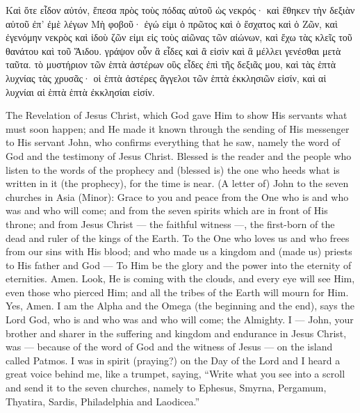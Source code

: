 \begin{pages}
\begin{Rightside}
		\pend
		\pstart
			Καὶ ὅτε εἶδον αὐτόν, ἔπεσα πρὸς τοὺς πόδας αὐτοῦ ὡς νεκρός· καὶ ἔθηκεν τὴν δεξιὰν αὐτοῦ ἐπ’ ἐμὲ λέγων Μὴ φοβοῦ· ἐγώ εἰμι ὁ πρῶτος καὶ ὁ ἔσχατος καὶ ὁ Ζῶν, καὶ ἐγενόμην νεκρὸς καὶ ἰδοὺ ζῶν εἰμι εἰς τοὺς αἰῶνας τῶν αἰώνων, καὶ ἔχω τὰς κλεῖς τοῦ θανάτου καὶ τοῦ Ἅιδου. γράψον οὖν ἃ εἶδες καὶ ἃ εἰσὶν καὶ ἃ μέλλει γενέσθαι μετὰ ταῦτα. τὸ μυστήριον τῶν ἑπτὰ ἀστέρων οὓς εἶδες ἐπὶ τῆς δεξιᾶς μου, καὶ τὰς ἑπτὰ λυχνίας τὰς χρυσᾶς· οἱ ἑπτὰ ἀστέρες ἄγγελοι τῶν ἑπτὰ ἐκκλησιῶν εἰσίν, καὶ αἱ λυχνίαι αἱ ἑπτὰ ἑπτὰ ἐκκλησίαι εἰσίν.
		\pend
        \endnumbering
    \end{Rightside}
    \begin{Leftside}
        \beginnumbering
			The Revelation of Jesus Christ, which God gave Him to show His servants what must soon happen; and He made it known through the sending of His messenger to His servant John, who confirms everything that he saw, namely the word of God and the testimony of Jesus Christ. Blessed is the reader and the people who listen to the words of the prophecy and (blessed is) the one who heeds what is written in it (the prophecy), for the time is near.
		\pend
		\pstart
			(A letter of) John to the seven churches in Asia (Minor): Grace to you and peace from the One who is and who was and who will come; and from the seven spirits which are in front of His throne; and from Jesus Christ — the faithful witness —, the first-born of the dead and ruler of the kings of the Earth.
		\pend
		\pstart
			To the One who loves us and who frees from our sins with His blood; and who made us a kingdom and (made us) priests to His father and God — To Him be the glory and the power into the eternity of eternities. Amen.
		\pend
		\pstart
			Look, He is coming with the clouds, and every eye will see Him, even those who pierced Him; and all the tribes of the Earth will mourn for Him. Yes, Amen.
		\pend
		\pstart
			I am the Alpha and the Omega (the beginning and the end), says the Lord God, who is and who was and who will come; the Almighty.
		\pend
		\pstart
			I — John, your brother and sharer in the suffering and kingdom and endurance in Jesus Christ, was — because of the word of God and the witness of Jesus — on the island called Patmos. I was in spirit (praying?) on the Day of the Lord and I heard a great voice behind me, like a trumpet, saying, “Write what you see into a scroll and send it to the seven churches, namely to Ephesus, Smyrna, Pergamum, Thyatira, Sardis, Philadelphia and Laodicea.”

\end{Leftside}
\end{pages}
